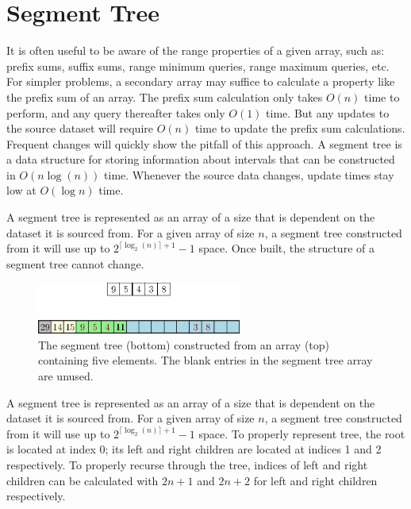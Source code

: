 \section{Segment Tree}


It is often useful to be aware of the range properties of a given array, such as: prefix sums, suffix sums, range minimum queries, range maximum queries, etc.
For simpler problems, a secondary array may suffice to calculate a property like the prefix sum of an array.
The prefix sum calculation only takes $O(n)$ time to perform, and any query thereafter takes only $O(1)$ time.
But any updates to the source dataset will require $O(n)$ time to update the prefix sum calculations.
Frequent changes will quickly show the pitfall of this approach.
A segment tree is a data structure for storing information about intervals that can be constructed in $O(n \log(n))$ time.
Whenever the source data changes, update times stay low at $O(\log n)$ time.



A segment tree is represented as an array of a size that is dependent on the dataset it is sourced from.
For a given array of size $n$, a segment tree constructed from it will use up to $2^{\lceil \log_2 (n)\rceil + 1} - 1$ space.
Once built, the structure of a segment tree cannot change.



\begin{figure}[h]
    \centering
    \includegraphics[width=0.6\textwidth]{./structures/segment-tree/source-array}
    \caption{\small The segment tree (bottom) constructed from an array (top) containing five elements.
      The blank entries in the segment tree array are unused.}
\end{figure}

A segment tree is represented as an array of a size that is dependent on the dataset it is sourced from.
For a given array of size $n$, a segment tree constructed from it will use up to $2^{\lceil \log_2 (n)\rceil + 1} - 1$ space.
To properly represent tree, the root is located at index 0; its left and right children are located at indices 1 and 2 respectively.
To properly recurse through the tree, indices of left and right children can be calculated with $2n + 1$ and $2n + 2$ for left and right children respectively.

